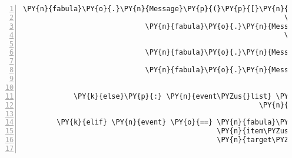 \begin{Verbatim}[commandchars=\\\{\},numbers=left,firstnumber=1,stepnumber=1]
                             \PY{n}{fabula}\PY{o}{.}\PY{n}{Message}\PY{p}{(}\PY{p}{[}\PY{n}{fabula}\PY{o}{.}\PY{n}{SaysEvent}\PY{p}{(}\PY{n}{identifier}\PY{o}{=}\PY{n}{ID\PYZus{}CASSANDRA}\PY{p}{,}
                                                              \PY{n}{text}\PY{o}{=}\PY{l+s}{\PYZsq{}}\PY{l+s}{Wollen wir dann gemeinsam weiter ziehen?}\PY{l+s}{\PYZsq{}}\PY{p}{)}\PY{p}{]}\PY{p}{)}\PY{p}{,}
                             \PY{n}{fabula}\PY{o}{.}\PY{n}{Message}\PY{p}{(}\PY{p}{[}\PY{n}{fabula}\PY{o}{.}\PY{n}{SaysEvent}\PY{p}{(}\PY{n}{identifier}\PY{o}{=}\PY{n}{ID\PYZus{}KUNI}\PY{p}{,}
                                                              \PY{n}{text}\PY{o}{=}\PY{l+s}{\PYZsq{}}\PY{l+s}{Sehr gerne! Das hat ja bisher }\PY{l+s}{\PYZsq{}}
                                                                   \PY{l+s}{\PYZsq{}}\PY{l+s}{auch ausgezeichnet geklappt!}\PY{l+s}{\PYZsq{}}\PY{p}{)}\PY{p}{]}\PY{p}{)}\PY{p}{,}
                             \PY{n}{fabula}\PY{o}{.}\PY{n}{Message}\PY{p}{(}\PY{p}{[}\PY{n}{fabula}\PY{o}{.}\PY{n}{PerceptionEvent}\PY{p}{(}\PY{n}{identifier}\PY{o}{=}\PY{n}{ID\PYZus{}KUNI}\PY{p}{,}
                                                                    \PY{n}{perception}\PY{o}{=}\PY{l+s}{\PYZsq{}}\PY{l+s}{ENDE...}\PY{l+s}{\PYZsq{}}\PY{p}{)}\PY{p}{]}\PY{p}{)}\PY{p}{,}
                             \PY{n}{fabula}\PY{o}{.}\PY{n}{Message}\PY{p}{(}\PY{p}{[}\PY{n}{fabula}\PY{o}{.}\PY{n}{PerceptionEvent}\PY{p}{(}\PY{n}{identifier}\PY{o}{=}\PY{n}{ID\PYZus{}CASSANDRA}\PY{p}{,}
                                                                    \PY{n}{perception}\PY{o}{=}\PY{l+s}{\PYZsq{}}\PY{l+s}{ENDE...}\PY{l+s}{\PYZsq{}}\PY{p}{)}\PY{p}{]}\PY{p}{)}\PY{p}{]}

            \PY{k}{else}\PY{p}{:} \PY{n}{event\PYZus{}list} \PY{o}{+}\PY{o}{=} \PY{p}{[}\PY{n}{fabula}\PY{o}{.}\PY{n}{PerceptionEvent}\PY{p}{(}\PY{n}{identifier}\PY{o}{=}\PY{n}{ID\PYZus{}CASSANDRA}\PY{p}{,}
                                                        \PY{n}{perception}\PY{o}{=}\PY{l+s}{\PYZsq{}}\PY{l+s}{Kuni möchte das bestimmt mit erleben...}\PY{l+s}{\PYZsq{}}\PY{p}{)}\PY{p}{]}

        \PY{k}{elif} \PY{n}{event} \PY{o}{==} \PY{n}{fabula}\PY{o}{.}\PY{n}{TriesToDropEvent}\PY{p}{(}\PY{n}{identifier}\PY{o}{=}\PY{n}{ID\PYZus{}KUNI}\PY{p}{,}
                                              \PY{n}{item\PYZus{}identifier}\PY{o}{=}\PY{l+s}{\PYZsq{}}\PY{l+s}{lute}\PY{l+s}{\PYZsq{}}\PY{p}{,}
                                              \PY{n}{target\PYZus{}identifier}\PY{o}{=}\PY{l+s}{\PYZsq{}}\PY{l+s}{guardian}\PY{l+s}{\PYZsq{}}\PY{p}{)}\PY{p}{:}


\end{Verbatim}
